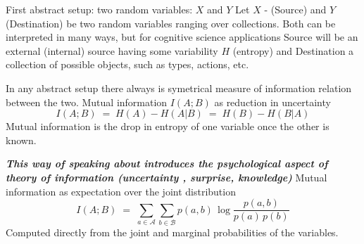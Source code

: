 \documentclass[10pt, aspectratio=169, handout]{beamer}
\begin{document}
\begin{frame}[label=abstract_setup] {First abstract setup: two random variables: \(X\) and \(Y\)}
Let \(X\) - (Source) and \(Y\) (Destination) be two random variables ranging over collections.
Both can be interpreted in many ways, but for cognitive science applications Source will be an external (internal) source having some variability $H$ (entropy) and Destination a collection of possible objects, such as types, actions, etc.

In any abstract setup there always is symetrical measure of information relation between the two.
Mutual information $I(A;B)$ as reduction in uncertainty
\[
I(A;B) \;=\; H(A) - H(A|B) \;=\; H(B) - H(B|A)
\]
Mutual information is the drop in entropy of one variable once the other is known.

\emph{\textbf{This way of speaking about introduces the psychological aspect of theory of information (uncertainty , surprise, knowledge)
}}
Mutual information as expectation over the joint distribution
\[
I(A;B) \;=\; \sum_{a \in \mathcal{A}} \sum_{b \in \mathcal{B}} 
p(a,b)\, \log \frac{p(a,b)}{p(a)\,p(b)}
\]
Computed directly from the joint and marginal probabilities of the variables.


\end{frame}
\end{document}
